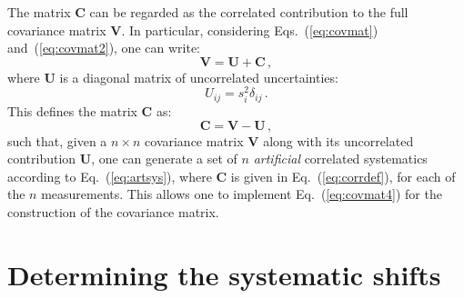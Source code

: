 \documentclass[10pt,a4paper]{article}
\begin{document}
The matrix \textbf{C} can be regarded as the correlated contribution to
the full covariance matrix \textbf{V}. In particular, considering
Eqs.~(\ref{eq:covmat}) and~(\ref{eq:covmat2}), one can write:
\begin{equation}
\mathbf{V} = \mathbf{U} + \mathbf{C}\,,
\end{equation}
where $\mathbf{U}$ is a diagonal matrix of uncorrelated uncertainties:
\begin{equation}
U_{ij} = s_i^2\delta_{ij}\,.
\end{equation}
This defines the matrix $\mathbf{C}$ as:
\begin{equation}\label{eq:corrdef}
\mathbf{C} = \mathbf{V} - \mathbf{U}\,,
\end{equation}
such that, given a $n\times n$ covariance matrix $\mathbf{V}$ along
with its uncorrelated contribution $\mathbf{U}$, one can generate a
set of $n$ \textit{artificial} correlated systematics according to
Eq.~(\ref{eq:artsys}), where $\mathbf{C}$ is given in
Eq.~(\ref{eq:corrdef}), for each of the $n$ measurements. This allows
one to implement Eq.~(\ref{eq:covmat4}) for the construction of the
covariance matrix.

\section{Determining the systematic shifts}\label{eq:sysshifts}
\end{document}
